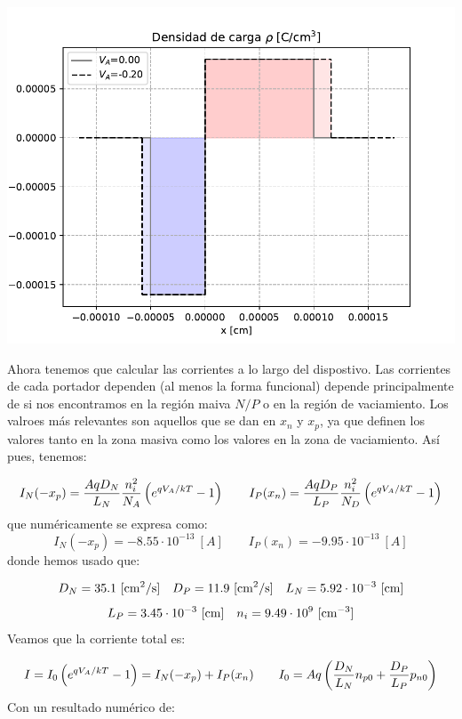 \begin{enumerate}[label=\alph*)]
\begin{figure}[h!]
\begin{subfigure}{0.47\textwidth}
    \end{subfigure}
    \end{figure}
    \begin{center}
        \includegraphics[width=0.6\linewidth]{Cuerpo/Ch_03/03_06_rho.pdf}
    \end{center}   
    Ahora tenemos que calcular las corrientes a lo largo del dispostivo. Las corrientes de cada portador dependen (al menos la forma funcional) depende principalmente de si nos encontramos en la región maiva $N/P$ o en la región de vaciamiento. 
    Los valroes más relevantes son aquellos que se dan en $x_n$ y $x_p$, ya que definen los valores tanto en la zona masiva como los valores en la zona de vaciamiento. Así pues, tenemos:

    \begin{equation}
        I_N (-x_p) = \frac{AqD_N}{L_N}  \frac{n_i^2}{N_A} \left( e^{qV_A/kT}-1 \right) \qquad
        I_P (x_n) = \frac{AqD_P}{L_P} \frac{n_i^2}{N_D}  \left( e^{qV_A/kT}-1 \right)
    \end{equation}
    que numéricamente se expresa como:
    \begin{equation}
        I_N (-x_p) = -8.55\cdot10^{-13} \ [\unit{A}] \qquad 
        I_P (x_n) = -9.95 \cdot 10^{-13}\ [\unit{A}]
    \end{equation}
    donde hemos usado que:

    \begin{equation}
        D_N = 35.1 \ [\unit{cm^2/s}] \quad 
        D_P = 11.9 \ [\unit{cm^2/s}] \quad L_N = 5.92 \cdot 10^{-3} \ [\cm] \end{equation}
    \begin{equation}     
        L_P = 3.45 \cdot 10^{-3} \ [\cm]  \quad n_i = 9.49 \cdot 10^{9} \ [\cm^{-3}]
    \end{equation}
    Veamos que la corriente total es:    

    \begin{equation}
        I = I_0 \left( e^{qV_A/kT}-1 \right) = I_N (-x_p) + I_P (x_n) \qquad  I_0 =  A q \left( \frac{D_N}{L_N} n_{p0} + \frac{D_P}{L_P} p_{n0} \right)
    \end{equation}
    Con un resultado numérico de: 


\end{enumerate}
